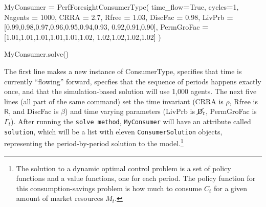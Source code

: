 \message{ !name(ccarroll_et_al_scipy_2018.tex)}\documentclass[10pt,twocolumn]{article}
\newenvironment{Shaded}{\begin{snugshade}}{\end{snugshade}}
\newcommand{\DecValTok}[1]{\textcolor[rgb]{0.00,0.00,0.81}{#1}}
\newcommand{\FloatTok}[1]{\textcolor[rgb]{0.00,0.00,0.81}{#1}}
\newcommand{\VariableTok}[1]{\textcolor[rgb]{0.00,0.00,0.00}{#1}}
\newcommand{\OperatorTok}[1]{\textcolor[rgb]{0.81,0.36,0.00}{\textbf{#1}}}
\newcommand{\NormalTok}[1]{#1}
\let\rmarkdownfootnote\footnote%
\def\footnote{\protect\rmarkdownfootnote}
\begin{document}
\begin{Shaded}
\begin{Highlighting}[]
\NormalTok{MyConsumer }\OperatorTok{=}\NormalTok{ PerfForesightConsumerType(}
\NormalTok{    time_flow}\OperatorTok{=}\VariableTok{True}\NormalTok{, cycles}\OperatorTok{=}\DecValTok{1}\NormalTok{, Nagents }\OperatorTok{=} \DecValTok{1000}\NormalTok{,}
\NormalTok{    CRRA }\OperatorTok{=} \FloatTok{2.7}\NormalTok{, Rfree }\OperatorTok{=} \FloatTok{1.03}\NormalTok{, DiscFac }\OperatorTok{=} \FloatTok{0.98}\NormalTok{,}
\NormalTok{    LivPrb }\OperatorTok{=}\NormalTok{ [}\FloatTok{0.99}\NormalTok{,}\FloatTok{0.98}\NormalTok{,}\FloatTok{0.97}\NormalTok{,}\FloatTok{0.96}\NormalTok{,}\FloatTok{0.95}\NormalTok{,}\FloatTok{0.94}\NormalTok{,}\FloatTok{0.93}\NormalTok{,}
              \FloatTok{0.92}\NormalTok{,}\FloatTok{0.91}\NormalTok{,}\FloatTok{0.90}\NormalTok{],}
\NormalTok{    PermGroFac }\OperatorTok{=}\NormalTok{ [}\FloatTok{1.01}\NormalTok{,}\FloatTok{1.01}\NormalTok{,}\FloatTok{1.01}\NormalTok{,}\FloatTok{1.01}\NormalTok{,}\FloatTok{1.01}\NormalTok{,}\FloatTok{1.02}\NormalTok{,}
                  \FloatTok{1.02}\NormalTok{,}\FloatTok{1.02}\NormalTok{,}\FloatTok{1.02}\NormalTok{,}\FloatTok{1.02}\NormalTok{] )}

\NormalTok{MyConsumer.solve()}
\end{Highlighting}
\end{Shaded}

The first line makes a new instance of ConsumerType, specifies that time
is currently ``flowing'' forward, specfies that the sequence of periods
happens exactly once, and that the simulation-based solution will use
1,000 agents. The next five lines (all part of the same command) set the
time invariant (CRRA is \(\rho\), Rfree is \(\mathsf{R}\), and DiscFac
is \(\beta\)) and time varying parameters (LivPrb is
\(\cancel{\mathsf{D}}_t\), PermGroFac is \(\Gamma_{t}\)). After running
the \texttt{solve\ method}, \texttt{MyConsumer} will have an attribute
called \texttt{solution}, which will be a list with eleven
\texttt{ConsumerSolution} objects, representing the period-by-period
solution to the model.\footnote{The solution to a dynamic optimal
  control problem is a set of policy functions and a value functions,
  one for each period. The policy function for this consumption-savings
  problem is how much to consume \(C_t\) for a given amount of market
  resources \(M_t\).}
\end{document}
